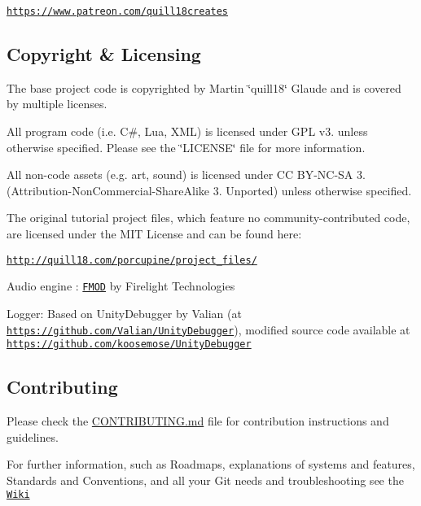 \begin{DoxyItemize}
\item \href{https://www.patreon.com/quill18creates}{\tt https\+://www.\+patreon.\+com/quill18creates}
\end{DoxyItemize}

\subsection*{Copyright \& Licensing}

The base project code is copyrighted by Martin \char`\"{}quill18\char`\"{} Glaude and is covered by multiple licenses.

All program code (i.\+e. C\#, Lua, X\+ML) is licensed under G\+PL v3. unless otherwise specified. Please see the \char`\"{}\+L\+I\+C\+E\+N\+S\+E\char`\"{} file for more information.

All non-\/code assets (e.\+g. art, sound) is licensed under CC B\+Y-\/\+N\+C-\/\+SA 3. (Attribution-\/\+Non\+Commercial-\/\+Share\+Alike 3. Unported) unless otherwise specified.

The original tutorial project files, which feature no community-\/contributed code, are licensed under the M\+IT License and can be found here\+:
\begin{DoxyItemize}
\item \href{http://quill18.com/porcupine/project_files/}{\tt http\+://quill18.\+com/porcupine/project\+\_\+files/}
\end{DoxyItemize}

Audio engine \+: \href{http://www.fmod.com/}{\tt F\+M\+OD} by Firelight Technologies

Logger\+: Based on Unity\+Debugger by Valian (at \href{https://github.com/Valian/UnityDebugger}{\tt https\+://github.\+com/\+Valian/\+Unity\+Debugger}), modified source code available at \href{https://github.com/koosemose/UnityDebugger}{\tt https\+://github.\+com/koosemose/\+Unity\+Debugger}

\subsection*{Contributing}

Please check the \hyperlink{_c_o_n_t_r_i_b_u_t_i_n_g_8md}{C\+O\+N\+T\+R\+I\+B\+U\+T\+I\+NG.md} file for contribution instructions and guidelines.

For further information, such as Roadmaps, explanations of systems and features, Standards and Conventions, and all your Git needs and troubleshooting see the \href{https://github.com/TeamPorcupine/ProjectPorcupine/wiki}{\tt Wiki}

